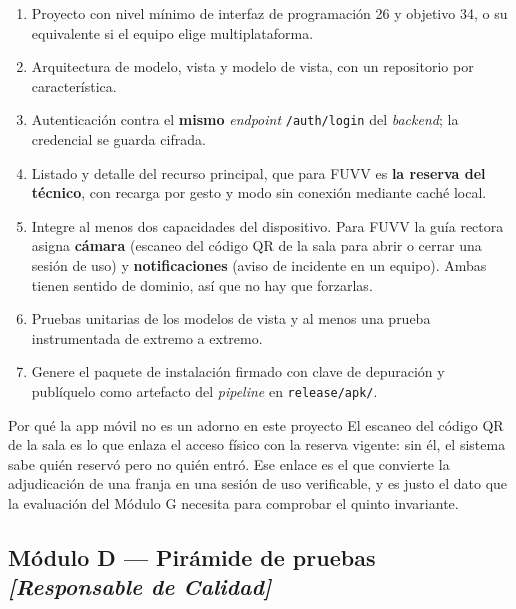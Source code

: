 \documentclass[11pt,a4paper]{article}
\begin{document}
\begin{enumerate}[leftmargin=*,itemsep=3pt]
	\item Proyecto con nivel mínimo de interfaz de programación 26 y objetivo 34, o su equivalente si el equipo elige multiplataforma.
	\item Arquitectura de modelo, vista y modelo de vista, con un repositorio por característica.
	\item Autenticación contra el \textbf{mismo} \emph{endpoint} \texttt{/auth/login} del \emph{backend}; la credencial se guarda cifrada.
	\item Listado y detalle del recurso principal, que para FUVV es \textbf{la reserva del técnico}, con recarga por gesto y modo sin conexión mediante caché local.
	\item Integre al menos dos capacidades del dispositivo. Para FUVV la guía rectora asigna \textbf{cámara} (escaneo del código QR de la sala para abrir o cerrar una sesión de uso) y \textbf{notificaciones} (aviso de incidente en un equipo). Ambas tienen sentido de dominio, así que no hay que forzarlas.
	\item Pruebas unitarias de los modelos de vista y al menos una prueba instrumentada de extremo a extremo.
	\item Genere el paquete de instalación firmado con clave de depuración y publíquelo como artefacto del \emph{pipeline} en \texttt{release/apk/}.
\end{enumerate}

\begin{defBox}{Por qué la app móvil no es un adorno en este proyecto}
	El escaneo del código QR de la sala es lo que enlaza el acceso físico con la reserva vigente: sin él, el sistema sabe quién reservó pero no quién entró. Ese enlace es el que convierte la adjudicación de una franja en una sesión de uso verificable, y es justo el dato que la evaluación del Módulo G necesita para comprobar el quinto invariante.
\end{defBox}

\subsection{Módulo D --- Pirámide de pruebas \emph{[Responsable de Calidad]}}
\end{document}
